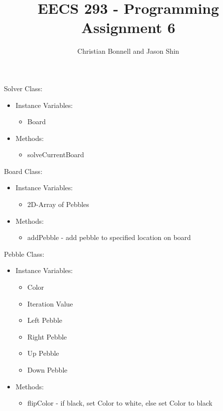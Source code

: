 \documentclass{article}
\begin{document}
\title{EECS 293 - Programming Assignment 6}
\author{Christian Bonnell and Jason Shin}
\maketitle
\begin{flushleft}
Solver Class:
\end{flushleft}
\begin{itemize}
	\item Instance Variables: 
	\begin{itemize}
  		\item Board
	\end{itemize}
	\item Methods:
	\begin{itemize}
		\item solveCurrentBoard
	\end{itemize}
\end{itemize}
Board Class:
\begin{itemize}
	\item Instance Variables: 
	\begin{itemize}
  		\item 2D-Array of Pebbles
	\end{itemize}
	\item Methods:
	\begin{itemize}
		\item addPebble - add pebble to specified location on board
	\end{itemize}
\end{itemize}
Pebble Class:
\begin{itemize}
	\item Instance Variables: 
	\begin{itemize}
  		\item Color
  		\item Iteration Value
  		\item Left Pebble
  		\item Right Pebble
  		\item Up Pebble
  		\item Down Pebble
	\end{itemize}
	\item Methods:
	\begin{itemize}
		\item flipColor - if black, set Color to white, else set Color to black
	\end{itemize}
\end{itemize}
\end{document}
